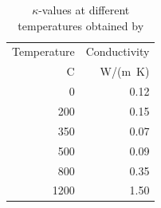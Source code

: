 \begin{table} 
	\caption{$\kappa$-values at different temperatures obtained by \citeauthor{Koning:1999}}
	\label{tablekoning}
	\begin{tabular}{ r r }
	\toprule
	Temperature & Conductivity\\
	{\textdegree}C & W/(m\ K)\\
	\midrule
	0&0.12\\
	200&0.15\\
	350&0.07\\
	500&0.09\\
	800&0.35\\
	1200&1.50\\
	\bottomrule
	\end{tabular}
\end{table}

